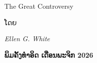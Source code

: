 \begin{titlepage}
\null\vspace*{0.13\textheight} %

\begin{center}
{\fontsize{28pt}{34pt}\selectfont\booktitle\par}
\vspace{0.45em}
{\fontsize{24pt}{28pt}\selectfont The Great Controversy\par}

\vspace{2.8em}

{\fontsize{18pt}{22pt}\selectfont ໂດຍ \bookauthor\par}
\vspace{0.35em}
{\fontsize{16pt}{19pt}\selectfont\itshape Ellen G. White\par}
\end{center}

\vfill

\begin{center}
\fontsize{14pt}{12pt}\selectfont\textbf{ພິມຄັ້ງທຳອິດ ເດືອນພະຈິກ 2026}
\end{center}


\vspace*{0.05\textheight} %
\end{titlepage}
